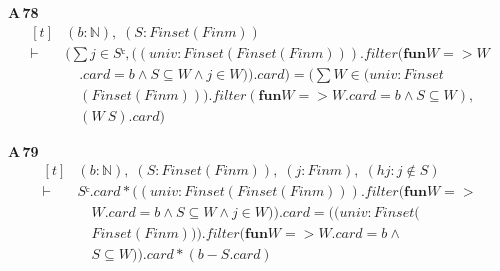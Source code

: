 \noindent\textbf{A\,78}\quad{}
{\footnotesize\[ \begin{aligned}[t]
&(\mathit{b} : \mathbb{N} ),\; (\mathit{S} : \mathit{Finset} (\mathit{Fin} \mathit{m}))\\
\vdash\;&(\textstyle\sum \mathit{j} \in \mathit{Sᶜ}, ((\mathit{univ} : \mathit{Finset} (\mathit{Finset} (\mathit{Fin} \mathit{m}))).\mathit{filter} (\mathbf{fun} \mathit{W} => \mathit{W}\\
&\quad .\mathit{card} = \mathit{b} \wedge \mathit{S} \subseteq \mathit{W} \wedge \mathit{j} \in \mathit{W})).\mathit{card}) = (\textstyle\sum \mathit{W} \in (\mathit{univ} : \mathit{Finset}\\
&\quad (\mathit{Finset} (\mathit{Fin} \mathit{m}))).\mathit{filter} (\mathbf{fun} \mathit{W} => \mathit{W}.\mathit{card} = \mathit{b} \wedge \mathit{S} \subseteq \mathit{W}),\\
&\quad (\mathit{W} \ \mathit{S}).\mathit{card})
\end{aligned} \]}

\noindent\textbf{A\,79}\quad{}
{\footnotesize\[ \begin{aligned}[t]
&(\mathit{b} : \mathbb{N} ),\; (\mathit{S} : \mathit{Finset} (\mathit{Fin} \mathit{m})),\; (\mathit{j} : \mathit{Fin} \mathit{m}),\; (\mathit{hj} : \mathit{j} \notin \mathit{S})\\
\vdash\;&\mathit{Sᶜ}.\mathit{card} * ((\mathit{univ} : \mathit{Finset} (\mathit{Finset} (\mathit{Fin} \mathit{m}))).\mathit{filter} (\mathbf{fun} \mathit{W} =>\\
&\quad \mathit{W}.\mathit{card} = \mathit{b} \wedge \mathit{S} \subseteq \mathit{W} \wedge \mathit{j} \in \mathit{W})).\mathit{card} = ((\mathit{univ} : \mathit{Finset} (\\
&\quad \mathit{Finset} (\mathit{Fin} \mathit{m}))).\mathit{filter} (\mathbf{fun} \mathit{W} => \mathit{W}.\mathit{card} = \mathit{b} \wedge\\
&\quad \mathit{S} \subseteq \mathit{W})).\mathit{card} * (\mathit{b} - \mathit{S}.\mathit{card})
\end{aligned} \]}

